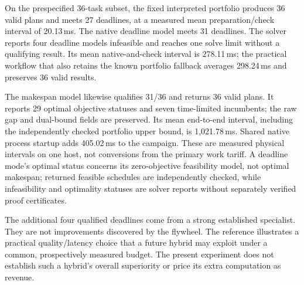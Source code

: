 On the prespecified 36-task subset, the fixed interpreted portfolio produces 36 valid plans and meets 27 deadlines, at a measured mean preparation/check interval of 20.13\,ms. The native deadline model meets 31 deadlines. The solver reports four deadline models infeasible and reaches one solve limit without a qualifying result. Its mean native-and-check interval is 278.11\,ms; the practical workflow that also retains the known portfolio fallback averages 298.24\,ms and preserves 36 valid results.

The makespan model likewise qualifies 31/36 and returns 36 valid plans. It reports 29 optimal objective statuses and seven time-limited incumbents; the raw gap and dual-bound fields are preserved. Its mean end-to-end interval, including the independently checked portfolio upper bound, is 1,021.78\,ms. Shared native process startup adds 405.02\,ms to the campaign. These are measured physical intervals on one host, not conversions from the primary work tariff. A deadline mode's optimal status concerns its zero-objective feasibility model, not optimal makespan; returned feasible schedules are independently checked, while infeasibility and optimality statuses are solver reports without separately verified proof certificates.

The additional four qualified deadlines come from a strong established specialist. They are not improvements discovered by the flywheel. The reference illustrates a practical quality/latency choice that a future hybrid may exploit under a common, prospectively measured budget. The present experiment does not establish such a hybrid's overall superiority or price its extra computation as revenue.
